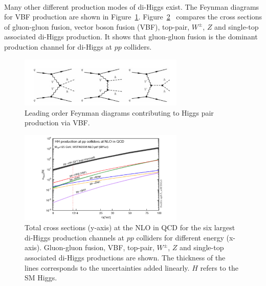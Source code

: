 \paragraph{}
Many other different production modes of di-Higgs exist. 
The Feynman diagrams for VBF production are shown in Figure~\ref{fig:SM_HH_VBF}. 
Figure~\ref{fig:SM_HH_xsec}~\cite{Frederix:2014hta} compares the cross sections of gluon-gluon fusion, vector boson fusion (VBF), top-pair, $W^{\pm}$, $Z$ and single-top associated di-Higgs production.
It shows that gluon-gluon fusion is the dominant production channel for di-Higgs at $pp$ colliders. 

\begin{figure}[htbp!]
  \centering
  \captionsetup{justification=centering}
  \includegraphics[width=0.7\textwidth]{figures/theory/SM_HH_VBF}
  \caption{Leading order Feynman diagrams contributing to Higgs pair production via VBF.}
  \label{fig:SM_HH_VBF}
\end{figure}

\begin{figure}[htbp!]
  \centering
  \captionsetup{justification=centering}
  \includegraphics[width=0.7\textwidth]{figures/theory/HH_xsec}
  \caption{Total cross sections (y-axis) at the NLO in QCD for the six largest di-Higgs production channels at $pp$ colliders for different energy (x-axis). Gluon-gluon fusion, VBF, top-pair, $W^{\pm}$, $Z$ and single-top associated di-Higgs productions are shown. The thickness of the lines corresponds to the uncertainties added linearly. $H$ refers to the SM Higgs.}
  \label{fig:SM_HH_xsec}
\end{figure}

